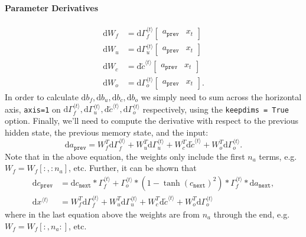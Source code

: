 \documentclass[12pt]{article}
\newcommand{\D}{\mathrm{d}}
\begin{document}
\paragraph{Parameter Derivatives}
\begin{align*}
  \D W_f &= \D \Gamma_f^{\langle t \rangle} \begin{bmatrix}  a_{\texttt{prev}} &     x_t   \end{bmatrix} \\
  \D W_u &= \D \Gamma_u^{\langle t \rangle} \begin{bmatrix}a_{\texttt{prev}} &     x_t     \end{bmatrix} \\
  \D W_c &= \D \tilde c^{\langle t \rangle} \begin{bmatrix} a_{\texttt{prev}} & x_t
\end{bmatrix} \\
  \D W_o &= \D \Gamma_o^{\langle t \rangle} \begin{bmatrix} a_{\texttt{prev}} & x_t
  \end{bmatrix}.
\end{align*}
In order to calculate $\D b_f, \D b_u, \D b_c, \D b_o$ we simply need to sum across the horizontal axis, \texttt{axis=1} on $\D \Gamma_f^{\langle t \rangle}, \D \Gamma_u^{\langle t \rangle}, \D \tilde c^{\langle t \rangle}, \D \Gamma_o^{\langle t \rangle}$ respectively, using the \texttt{keepdims = True} option.
Finally, we'll need to compute the derivative with respect to the previous hidden state, the previous memory state, and the input:
\[
  \D a_{\texttt{prev}} = W_f^T \D \Gamma_f^{\langle t \rangle} + W_u^T \D \Gamma_u^{\langle t \rangle} + W_c^T \D \tilde c^{\langle t \rangle} + W_o^T \D \Gamma_o^{\langle t \rangle}.
\]
Note that in the above equation, the weights only include the first $n_a$ terms, e.g. $W_f = W_f[:,:n_a]$, etc. Further, it can be shown that
\begin{align*}
  \D c_{\texttt{prev}} &= \D c_{\texttt{next}} * \Gamma_f^{\langle t \rangle} + \Gamma_o^{\langle t \rangle} * \left(1 - \tanh(c_{\texttt{next}})^2\right) *                          \Gamma_f^{\langle t \rangle} * \D a_{\texttt{next}}, \\
  \D x^{\langle t \rangle} &= W_f^T \D \Gamma_f^{\langle t \rangle} + W_u^T \D \Gamma_u^{\langle t \rangle} + W_c^T\D \tilde c^{\langle t \rangle} + W_o^T \D \Gamma_o^{\langle t \rangle}
\end{align*}
where in the last equation above the weights are from $n_a$ through the end, e.g. $W_f = W_f[:, n_a:]$, etc.
\end{document}

